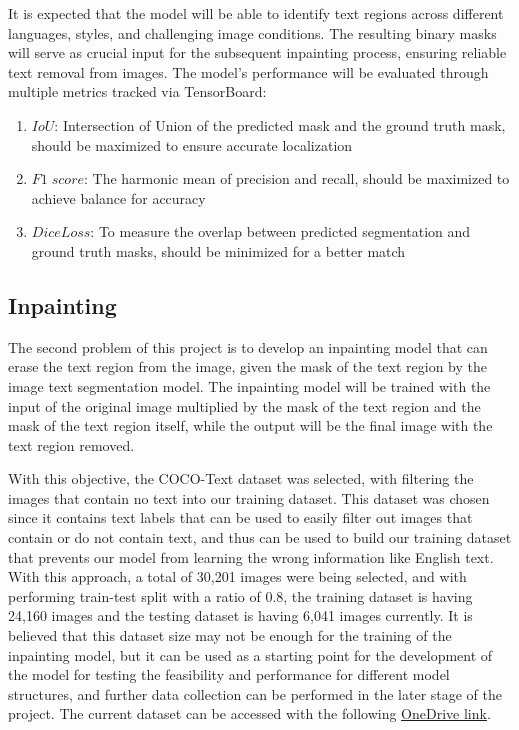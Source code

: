 \documentclass[10pt,twocolumn,letterpaper]{article}
\begin{document}
It is expected that the model will be able to identify text regions across different languages, styles, and challenging image conditions. 
The resulting binary masks will serve as crucial input for the subsequent inpainting process, ensuring reliable text removal from images. 
The model's performance will be evaluated through multiple metrics tracked via TensorBoard:
\begin{enumerate}
    \item $IoU$: Intersection of Union of the predicted mask and the ground truth mask, should be maximized to ensure accurate localization
    \item $F1\;score$: The harmonic mean of precision and recall, should be maximized to achieve balance for accuracy 
    \item $Dice Loss$: To measure the overlap between predicted segmentation and ground truth masks, should be minimized for a better match
\end{enumerate}

\subsection{Inpainting}

The second problem of this project is to develop an inpainting model that can erase the text region from the image, given the mask of the text region by 
the image text segmentation model. The inpainting model will be trained with the input of the original image multiplied by the mask of the text region and 
the mask of the text region itself, while the output will be the final image with the text region removed.

With this objective, the COCO-Text dataset was selected, with filtering the images that contain no text into our training dataset. This dataset was 
chosen since it contains text labels that can be used to easily filter out images that contain or do not contain text, and thus can be used to build our training 
dataset that prevents our model from learning the wrong information like English text. With this approach, a total of 30,201 images were being selected, and with 
performing train-test split with a ratio of 0.8, the training dataset is having 24,160 images and the testing dataset is having 6,041 images currently. It is believed
that this dataset size may not be enough for the training of the inpainting model, but it can be used as a starting point for the development of the model for testing
the feasibility and performance for different model structures, and further data collection can be performed in the later stage of the project. The current dataset can
be accessed with the following 
\href{https://hkustconnect-my.sharepoint.com/:u:/g/personal/tkleungal_connect_ust_hk/EUJ-38d8cptNgW2RK0JzHI4BfIi5mXwbIEFObTG7ji9f8g?e=LqJ1Eu}{OneDrive link}.
\end{document}
